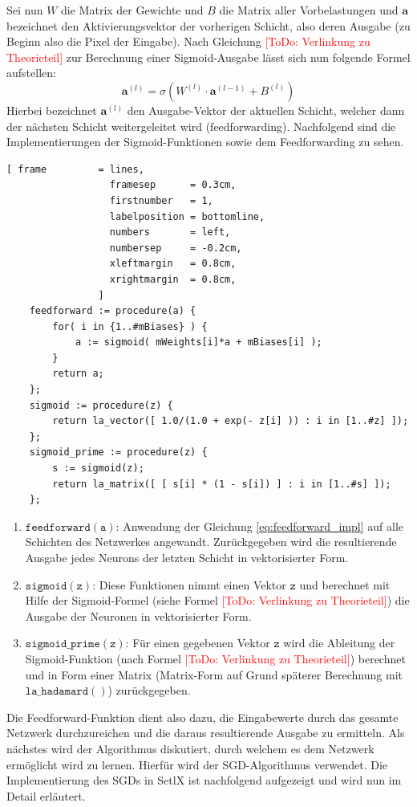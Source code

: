 \noindent
Sei nun $W$ die Matrix der Gewichte und $B$ die Matrix aller Vorbelastungen und $\mathbf{a}$ bezeichnet den Aktivierungsvektor der vorherigen Schicht, also deren Ausgabe (zu Beginn also die Pixel der Eingabe). Nach Gleichung \textcolor{red}{[ToDo: Verlinkung zu Theorieteil]} zur Berechnung einer Sigmoid-Ausgabe lässt sich nun folgende Formel aufstellen: 
\begin{equation}\label{eq:feedforward_impl}
	\mathbf{a}^{(l)} = \sigma(W^{(l)}\cdot \mathbf{a}^{(l-1)} + B^{(l)})
\end{equation}
\noindent
Hierbei bezeichnet $\mathbf{a}^{(l)}$ den Ausgabe-Vektor der aktuellen Schicht, welcher dann der nächsten Schicht weitergeleitet wird (feedforwarding). Nachfolgend sind die Implementierungen der Sigmoid-Funktionen sowie dem Feedforwarding zu sehen.
\begin{Verbatim}[ frame         = lines, 
                  framesep      = 0.3cm, 
                  firstnumber   = 1,
                  labelposition = bottomline,
                  numbers       = left,
                  numbersep     = -0.2cm,
                  xleftmargin   = 0.8cm,
                  xrightmargin  = 0.8cm,
                ]
    feedforward := procedure(a) {
        for( i in {1..#mBiases} ) { 
            a := sigmoid( mWeights[i]*a + mBiases[i] );
        }
        return a;
    };                            
    sigmoid := procedure(z) {
        return la_vector([ 1.0/(1.0 + exp(- z[i] )) : i in [1..#z] ]);
    };
    sigmoid_prime := procedure(z) {
        s := sigmoid(z); 
        return la_matrix([ [ s[i] * (1 - s[i]) ] : i in [1..#s] ]);
    };
\end{Verbatim}
\begin{enumerate}
\item $\mathtt{feedforward(a)}$: Anwendung der Gleichung \eqref{eq:feedforward_impl} auf alle Schichten des Netzwerkes angewandt. Zurückgegeben wird die resultierende Ausgabe jedes Neurons der letzten Schicht in vektorisierter Form.
\item $\mathtt{sigmoid(z)}$: Diese Funktionen nimmt einen Vektor $\mathtt{z}$ und berechnet mit Hilfe der Sigmoid-Formel (siehe Formel \textcolor{red}{[ToDo: Verlinkung zu Theorieteil]}) die Ausgabe der Neuronen in vektorisierter Form.
\item $\mathtt{sigmoid\_prime(z)}$: Für einen gegebenen Vektor $\mathtt{z}$ wird die Ableitung der Sigmoid-Funktion (nach Formel \textcolor{red}{[ToDo: Verlinkung zu Theorieteil]}) berechnet und in Form einer Matrix (Matrix-Form auf Grund späterer Berechnung mit $\mathtt{la\_hadamard()}$) zurückgegeben.
\end{enumerate}
\noindent
Die Feedforward-Funktion dient also dazu, die Eingabewerte durch das gesamte Netzwerk durchzureichen und die daraus resultierende Ausgabe zu ermitteln. Als nächstes wird der Algorithmus diskutiert, durch welchem es dem Netzwerk ermöglicht wird zu \glqq lernen\grqq. Hierfür wird der SGD-Algorithmus verwendet. Die Implementierung des SGDs in SetlX ist nachfolgend aufgezeigt und wird nun im Detail erläutert.


